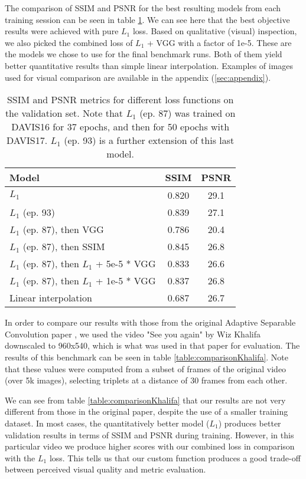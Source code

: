 \documentclass[10pt,twocolumn,letterpaper]{article}
\begin{document}
The comparison of SSIM and PSNR for the best resulting models from each training session can be seen in table \ref{table:comparisonAllModels}. We can see here that the best objective results were achieved with pure $L_1$ loss. Based on qualitative (visual) inspection, we also picked the combined loss of $L_1$ + VGG with a factor of 1e-5. These are the models we chose to use for the final benchmark runs. Both of them yield better quantitative results than simple linear interpolation. Examples of images used for visual comparison are available in the appendix (\ref{sec:appendix}).

\begin{table}[h]
\centering
\begin{tabular}{|l|c|c|}
\hline
	Model & SSIM & PSNR \\
	\hline
$L_1$                                       & 0.820 & 29.1 \\
$L_1$ (ep. 93)                              & 0.839 & 27.1 \\
$L_1$ (ep. 87), then VGG                    & 0.786 & 20.4  \\
$L_1$ (ep. 87), then SSIM                   & 0.845 & 26.8  \\
$L_1$ (ep. 87), then $L_1$ + 5e-5 * VGG     & 0.833 & 26.6  \\
$L_1$ (ep. 87), then $L_1$ + 1e-5 * VGG     & 0.837 & 26.8  \\
Linear interpolation                        & 0.687 & 26.7  \\
	\hline
\end{tabular}
\vspace{1em}
\caption{SSIM and PSNR metrics for different loss functions on the validation set. Note that $L_1$ (ep. 87) was trained on DAVIS16 for 37 epochs, and then for 50 epochs with DAVIS17. $L_1$ (ep. 93) is a further extension of this last model.}
\label{table:comparisonAllModels}
\end{table}

In order to compare our results with those from the original Adaptive Separable Convolution paper \cite{AdapConv}, we used the video "See you again" by Wiz Khalifa downscaled to 960x540, which is what was used in that paper for evaluation. The results of this benchmark can be seen in table \ref{table:comparisonKhalifa}. Note that these values were computed from a subset of frames of the original video (over 5k images), selecting triplets at a distance of 30 frames from each other.

We can see from table \ref{table:comparisonKhalifa} that our results are not very different from those in the original paper, despite the use of a smaller training dataset. In most cases, the quantitatively better model ($L_1$) produces better validation results in terms of SSIM and PSNR during training. However, in this particular video we produce higher scores with our combined loss in comparison with the $L_1$ loss. This tells us that our custom function produces a good trade-off between perceived visual quality and metric evaluation.
\end{document}
